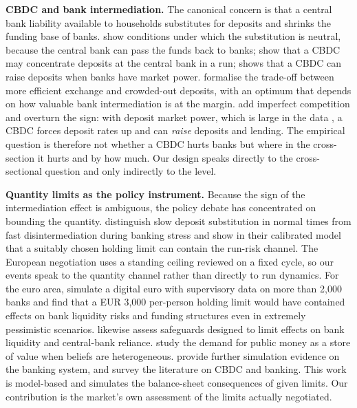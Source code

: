 \documentclass[11pt]{article}
\theoremstyle{plain}\newtheorem{proposition}{Proposition}
\begin{document}
\textbf{CBDC and bank intermediation.} The canonical concern is that a central bank liability available to households substitutes for deposits and shrinks the funding base of banks. \citet{brunnermeier2019} show conditions under which the substitution is neutral, because the central bank can pass the funds back to banks; \citet{fernandezvillaverde2021} show that a CBDC may concentrate deposits at the central bank in a run; \citet{andolfatto2021} shows that a CBDC can raise deposits when banks have market power. \citet{keister2023} formalise the trade-off between more efficient exchange and crowded-out deposits, with an optimum that depends on how valuable bank intermediation is at the margin. \citet{chiu2023} add imperfect competition and overturn the sign: with deposit market power, which is large in the data \citep{drechsler2017}, a CBDC forces deposit rates up and can \emph{raise} deposits and lending. The empirical question is therefore not whether a CBDC hurts banks but where in the cross-section it hurts and by how much. Our design speaks directly to the cross-sectional question and only indirectly to the level.

\textbf{Quantity limits as the policy instrument.} Because the sign of the intermediation effect is ambiguous, the policy debate has concentrated on bounding the quantity. \citet{bidder2024} distinguish slow deposit substitution in normal times from fast disintermediation during banking stress and show in their calibrated model that a suitably chosen holding limit can contain the run-risk channel. The European negotiation uses a standing ceiling reviewed on a fixed cycle, so our events speak to the quantity channel rather than directly to run dynamics. For the euro area, \citet{meller2023} simulate a digital euro with supervisory data on more than 2,000 banks and find that a EUR 3,000 per-person holding limit would have contained effects on bank liquidity risks and funding structures even in extremely pessimistic scenarios. \citet{lambert2024} likewise assess safeguards designed to limit effects on bank liquidity and central-bank reliance. \citet{munoz2023} study the demand for public money as a store of value when beliefs are heterogeneous. \citet{auer2025} provide further simulation evidence on the banking system, and \citet{chapman2023} survey the literature on CBDC and banking. This work is model-based and simulates the balance-sheet consequences of given limits. Our contribution is the market's own assessment of the limits actually negotiated.
\end{document}
